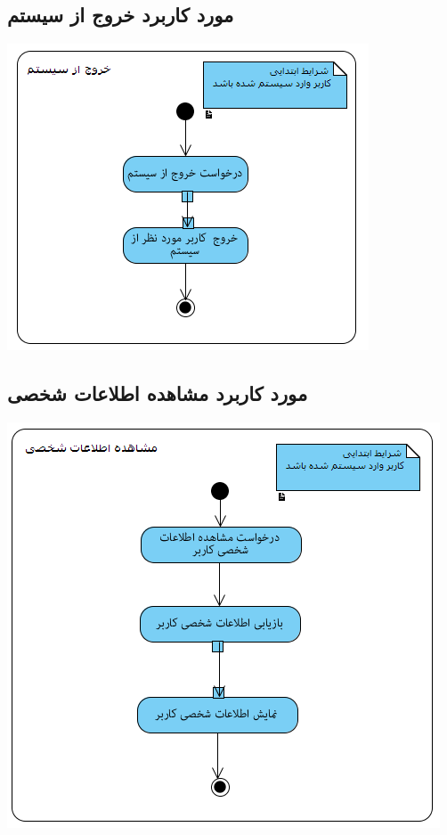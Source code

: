 \documentclass{article}
\begin{document}
\newpage
\vspace{2cm}
\subsection*{مورد کاربرد خروج از سیستم}
\vspace{2cm}
\begin{center}
\includegraphics[width=\textwidth]{ActivityDiagrams/14.png}
\end{center}

\newpage
\vspace{2cm}
\subsection*{مورد کاربرد مشاهده اطلاعات شخصی}
\vspace{2cm}
\begin{center}
\includegraphics[width=\textwidth]{ActivityDiagrams/15.png}
\end{center}
\end{document}
